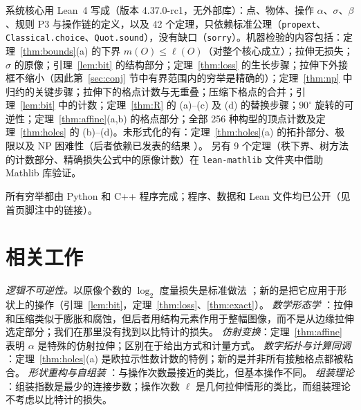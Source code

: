 \documentclass[11pt,a4paper]{article}
\theoremstyle{plain}
\theoremstyle{definition}
\theoremstyle{remark}
\begin{document}
系统核心用 Lean~4 \cite{lean} 写成（版本 4.37.0-rc1，无外部库）：点、物体、操作 $\alpha$、$\sigma$、$\beta$、规则 P3 与操作链的定义，以及 42 个定理，只依赖标准公理（\texttt{propext}、\texttt{Classical.choice}、\texttt{Quot.sound}），没有缺口（\texttt{sorry}）。机器检验的内容包括：定理~\ref{thm:bounds}(a) 的下界 $m(O)\le\ell(O)$（对整个核心成立）；拉伸无损失；$\sigma$ 的原像；引理~\ref{lem:bit} 的结构部分；定理~\ref{thm:loss} 的生长步骤；拉伸下外接框不缩小（因此第~\ref{sec:conj} 节中有界范围内的穷举是精确的）；定理~\ref{thm:np} 中归约的关键步骤；拉伸下的格点计数与无重叠；压缩下格点的合并；引理~\ref{lem:bit} 中的计数；定理~\ref{thm:R} 的 (a)–(c) 及 (d) 的替换步骤；$90^\circ$ 旋转的可逆性；定理~\ref{thm:affine}(a,b) 的格点部分；全部 256 种构型的顶点计数及定理~\ref{thm:holes} 的 (b)–(d)。未形式化的有：定理~\ref{thm:holes}(a) 的拓扑部分、极限以及 NP 困难性（后者依赖已发表的结果 \cite{jiang}）。 另有 9 个定理（秩下界、树方法的计数部分、精确损失公式中的原像计数）在 \texttt{lean-mathlib} 文件夹中借助 Mathlib 库验证。

所有穷举都由 Python 和 C++ 程序完成；程序、数据和 Lean 文件均已公开（见首页脚注中的链接）。

\section{相关工作}

\emph{逻辑不可逆性。}以原像个数的 $\log_2$ 度量损失是标准做法 \cite{landauer,frank}；新的是把它应用于形状上的操作（引理~\ref{lem:bit}，定理~\ref{thm:loss}、\ref{thm:exact}）。
\emph{数学形态学} \cite{serra}：拉伸和压缩类似于膨胀和腐蚀，但后者用结构元素作用于整幅图像，而不是从边缘拉伸选定部分；我们在那里没有找到以比特计的损失。
\emph{仿射变换}：定理~\ref{thm:affine} 表明 $\alpha$ 是特殊的仿射拉伸；区别在于给出方式和计量方式。
\emph{数字拓扑与计算同调} \cite{kong,kaczynski,toriwaki}：定理~\ref{thm:holes}(a) 是欧拉示性数计数的特例；新的是并非所有接触格点都被粘合。
\emph{形状重构与自组装} \cite{akitaya,soloveichik}：与操作次数最接近的类比，但基本操作不同。
\emph{组装理论} \cite{assembly}：组装指数是最少的连接步数；操作次数 $\ell$ 是几何拉伸情形的类比，而组装理论不考虑以比特计的损失。
\end{document}
